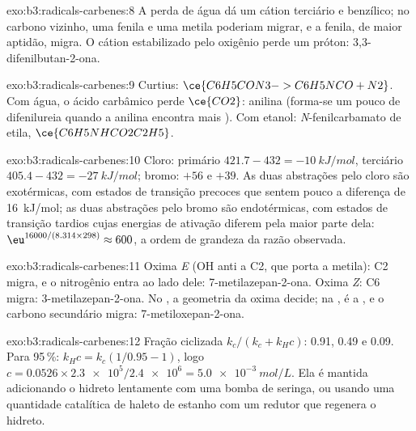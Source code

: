 \begin{solution}{exo:b3:radicals-carbenes:8}
A perda de água dá um cátion terciário e benzílico; no carbono vizinho, uma fenila
e uma metila poderiam migrar, e a fenila, de maior aptidão, migra. O
cátion estabilizado pelo oxigênio perde um próton: 3,3-difenilbutan-2-ona.
\end{solution}

\begin{solution}{exo:b3:radicals-carbenes:9}
Curtius: $\ce{C6H5CON3 -> C6H5NCO + N2}$. Com água, o ácido carbâmico perde $\ce{CO2}$: anilina
(forma-se um pouco de difenilureia quando a anilina encontra mais ). Com etanol:
\textit{N}-fenilcarbamato de etila, $\ce{C6H5NHCO2C2H5}$.
\end{solution}

\begin{solution}{exo:b3:radicals-carbenes:10}
Cloro: primário $421.7 - 432 = \qty{-10}{kJ/mol}$, terciário $405.4 - 432 = \qty{-27}{kJ/mol}$; bromo: $+56$ e
$+39$. As duas abstrações pelo cloro são exotérmicas, com estados de transição precoces que
sentem pouco a diferença de \qty{16}{kJ/mol}; as duas abstrações pelo bromo são endotérmicas,
com estados de transição tardios cujas energias de ativação diferem pela maior parte dela:
$\eu^{16000/(8.314 \times 298)} \approx 600$, a ordem de grandeza da razão observada.
\end{solution}

\begin{solution}{exo:b3:radicals-carbenes:11}
Oxima \textit{E} (OH anti a C2, que porta a metila): C2 migra, e o nitrogênio entra
ao lado dele: 7-metilazepan-2-ona. Oxima \textit{Z}: C6 migra: 3-metilazepan-2-ona. No
, a geometria da oxima decide; na ,
é a , e o carbono secundário migra:
7-metiloxepan-2-ona.
\end{solution}

\begin{solution}{exo:b3:radicals-carbenes:12}
Fração ciclizada $k_c/(k_c + k_H c)$: 0.91, 0.49 e 0.09. Para 95\,\%: $k_Hc = k_c(1/0.95 - 1)$, logo
$c = 0.0526 \times \num{2.3e5}/\num{2.4e6} = \qty{5.0e-3}{mol/L}$. Ela é mantida adicionando o hidreto lentamente com uma
bomba de seringa, ou usando uma quantidade catalítica de haleto de estanho com um redutor
que regenera o hidreto.
\end{solution}

